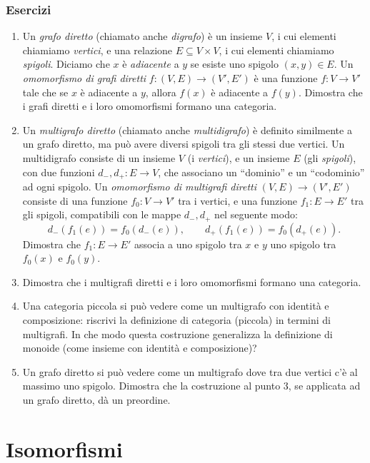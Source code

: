 \subsubsection*{Esercizi}
\begin{enumerate}
    \item Un \emph{grafo diretto} (chiamato anche \emph{digrafo}) è un insieme $V$, i cui elementi chiamiamo \emph{vertici}, e una relazione $E\subseteq V\times V$, i cui elementi chiamiamo \emph{spigoli}. Diciamo che $x$ è \emph{adiacente} a $y$ se esiste uno spigolo $(x,y)\in E$. Un \emph{omomorfismo di grafi diretti} $f:(V,E)\to (V',E')$ è una funzione $f:V\to V'$ tale che se $x$ è adiacente a $y$, allora $f(x)$ è adiacente a $f(y)$. Dimostra che i grafi diretti e i loro omomorfismi formano una categoria.
    \item Un \emph{multigrafo diretto} (chiamato anche \emph{multidigrafo}) è definito similmente a un grafo diretto, ma può avere diversi spigoli tra gli stessi due vertici. Un multidigrafo consiste di un insieme $V$ (i \emph{vertici}), e un insieme $E$ (gli \emph{spigoli}), con due funzioni $d_-,d_+:E\to V$, che associano un ``dominio'' e un ``codominio'' ad ogni spigolo. Un \emph{omomorfismo di multigrafi diretti} $(V,E)\to (V',E')$ consiste di una funzione $f_0:V\to V'$ tra i vertici, e una funzione $f_1:E\to E'$ tra gli spigoli, compatibili con le mappe $d_-,d_+$ nel seguente modo:
    \[
    d_-(f_1(e)) = f_0(d_-(e)) ,\qquad d_+(f_1(e)) = f_0(d_+(e)) .
    \]
    Dimostra che $f_1:E\to E'$ associa a uno spigolo tra $x$ e $y$ uno spigolo tra $f_0(x)$ e $f_0(y)$.
    \item Dimostra che i multigrafi diretti e i loro omomorfismi formano una categoria.
    \item Una categoria piccola si può vedere come un multigrafo con identità e composizione: riscrivi la definizione di categoria (piccola) in termini di multigrafi.  In che modo questa costruzione generalizza la definizione di monoide (come insieme con identità e composizione)?
    \item Un grafo diretto si può vedere come un multigrafo dove tra due vertici c'è al massimo uno spigolo. Dimostra che la costruzione al punto 3, se applicata ad un grafo diretto, dà un preordine.
\end{enumerate}
\color{black}
\section{Isomorfismi}\label{isomorfismi}

